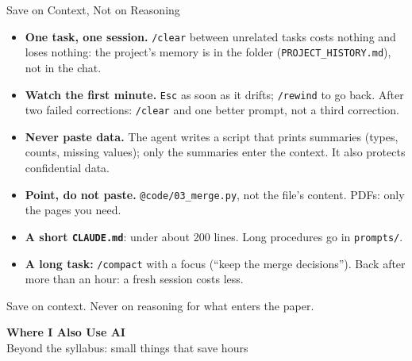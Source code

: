 \documentclass[svgnames,x11names,dvipsnames]{beamer}
\newcommand{\chg}[1]{{\bfseries #1}}
\renewcommand{\chg}[1]{#1}
\begin{document}
\begin{frame}{Save on Context, Not on Reasoning}

\small
\begin{itemize}
    \setlength{\itemsep}{2pt}
    \item \textbf{One task, one session.} \texttt{/clear} between unrelated tasks costs nothing and loses nothing: the project's memory is in the folder (\texttt{PROJECT\_HISTORY.md}), not in the chat.
    \item \textbf{Watch the first minute.} \texttt{Esc} as soon as it drifts; \texttt{/rewind} to go back. After two failed corrections: \texttt{/clear} and one better prompt, not a third correction.
    \item \textbf{Never paste data.} The agent writes a script that prints summaries (types, counts, missing values); only the summaries enter the context. It also protects confidential data.
    \item \textbf{Point, do not paste.} \texttt{@code/03\_merge.py}, not the file's content. PDFs: only the pages you need.
    \item \textbf{A short \texttt{CLAUDE.md}}: under about 200 lines. Long procedures go in \texttt{prompts/}.
    \item \textbf{A long task:} \texttt{/compact} with a focus (``keep the merge decisions''). Back after more than an hour: a fresh session costs less.
\end{itemize}

\vspace{0.15cm}

\centering
\normalsize
Save on context. Never on reasoning for what enters the paper.

\end{frame}


\begin{frame}[plain]
  \centering
  \vfill
  {\LARGE \textbf{\textcolor{titleblue}{\chg{Where I Also Use AI}}}}\\[0.4cm]
  {\chg{Beyond the syllabus: small things that save hours}}
  \vfill
\end{frame}
\end{document}

